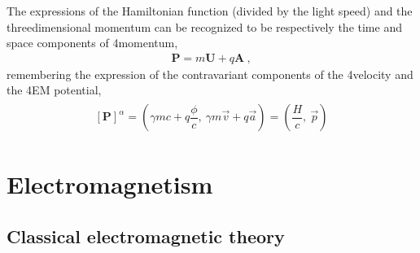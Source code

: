 \documentclass[letterpaper,10pt,english]{jupyterBook}
\begin{document}
\sphinxAtStartPar
The expressions of the Hamiltonian function (divided by the light speed) and the three\sphinxhyphen{}dimensional momentum can be recognized to be respectively the time and space components of 4\sphinxhyphen{}momentum,
\begin{equation*}
\begin{split}\mathbf{P} = m \mathbf{U} + q \mathbf{A} \ ,\end{split}
\end{equation*}
\sphinxAtStartPar
remembering the expression of the contravariant components of the 4\sphinxhyphen{}velocity and the 4\sphinxhyphen{}EM potential,
\begin{equation*}
\begin{split}\begin{aligned}
  \left[\mathbf{P}\right]^{\alpha} = \left( \gamma m c + q \dfrac{\phi}{c} , \ \gamma m \vec{v} + q \vec{a} \right) = \left( \dfrac{H}{c} , \ \vec{p}  \right)
\end{aligned}\end{split}
\end{equation*}

\section{Electromagnetism}
\label{\detokenize{ch/relativity-special/notes:electromagnetism}}

\subsection{Classical electromagnetic theory}
\label{\detokenize{ch/relativity-special/notes:classical-electromagnetic-theory}}
\end{document}
